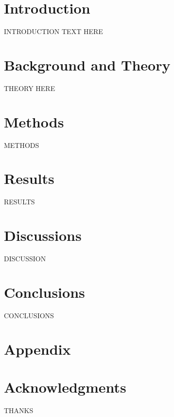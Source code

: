 \documentclass[master,
               twoside,
               BCOR10mm,
               english,english,
               english,english
               final,
               ]{GAUBM}
\begin{document}
\mainmatter   %
\chapter{Introduction}
INTRODUCTION TEXT HERE
\chapter{Background and Theory}
THEORY HERE

\chapter{Methods}
METHODS

\chapter{Results}
RESULTS

\chapter{Discussions}
DISCUSSION

\chapter{Conclusions}
CONCLUSIONS

\appendix
\chapter{Appendix}



\cleardoublepage



\chapter*{Acknowledgments}
THANKS

\Declaration
\end{document}
